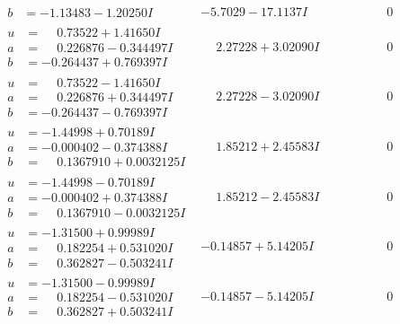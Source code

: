 \documentclass[1p]{elsarticle_modified}
\theoremstyle{definition}
\begin{document}
$$\begin{array}{c|c|c}
\begin{aligned}
b &= -1.13483 - 1.20250 I\end{aligned}
 & -5.7029 - 17.1137 I & \phantom{-0.000000 } 0 \\ \hline\begin{aligned}
u &= \phantom{-}0.73522 + 1.41650 I \\
a &= \phantom{-}0.226876 - 0.344497 I \\
b &= -0.264437 + 0.769397 I\end{aligned}
 & \phantom{-}2.27228 + 3.02090 I & \phantom{-0.000000 } 0 \\ \hline\begin{aligned}
u &= \phantom{-}0.73522 - 1.41650 I \\
a &= \phantom{-}0.226876 + 0.344497 I \\
b &= -0.264437 - 0.769397 I\end{aligned}
 & \phantom{-}2.27228 - 3.02090 I & \phantom{-0.000000 } 0 \\ \hline\begin{aligned}
u &= -1.44998 + 0.70189 I \\
a &= -0.000402 - 0.374388 I \\
b &= \phantom{-}0.1367910 + 0.0032125 I\end{aligned}
 & \phantom{-}1.85212 + 2.45583 I & \phantom{-0.000000 } 0 \\ \hline\begin{aligned}
u &= -1.44998 - 0.70189 I \\
a &= -0.000402 + 0.374388 I \\
b &= \phantom{-}0.1367910 - 0.0032125 I\end{aligned}
 & \phantom{-}1.85212 - 2.45583 I & \phantom{-0.000000 } 0 \\ \hline\begin{aligned}
u &= -1.31500 + 0.99989 I \\
a &= \phantom{-}0.182254 + 0.531020 I \\
b &= \phantom{-}0.362827 - 0.503241 I\end{aligned}
 & -0.14857 + 5.14205 I & \phantom{-0.000000 } 0 \\ \hline\begin{aligned}
u &= -1.31500 - 0.99989 I \\
a &= \phantom{-}0.182254 - 0.531020 I \\
b &= \phantom{-}0.362827 + 0.503241 I\end{aligned}
 & -0.14857 - 5.14205 I & \phantom{-0.000000 } 0 \\ \hline\begin{aligned}

\end{aligned}
\end{array}$$
\end{document}
